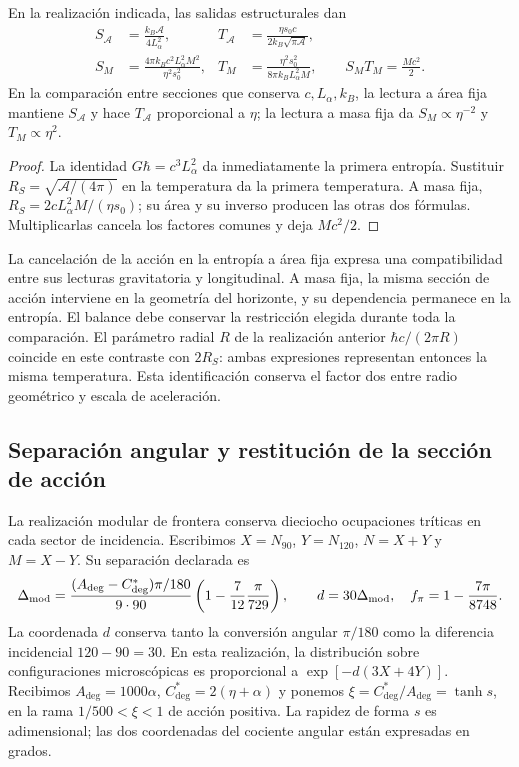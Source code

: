 \begin{proposition}
\label{ins29:vii:area_masa}
En la realización indicada, las salidas estructurales dan
\begin{align*}
 S_{\mathcal A}&=\frac{k_B\mathcal A}{4L_\alpha^2},&
 T_{\mathcal A}&=\frac{\eta s_0c}{2k_B\sqrt{\pi\mathcal A}},\\
 S_M&=\frac{4\pi k_Bc^2L_\alpha^2M^2}{\eta^2s_0^2},&
 T_M&=\frac{\eta^2s_0^2}{8\pi k_BL_\alpha^2M},
 \qquad S_MT_M=\frac{Mc^2}{2}.
\end{align*}
En la comparación entre secciones que conserva \(c,L_\alpha,k_B\),
la lectura a área fija mantiene \(S_{\mathcal A}\) y hace
\(T_{\mathcal A}\) proporcional a \(\eta\); la lectura a masa fija
da \(S_M\propto\eta^{-2}\) y \(T_M\propto\eta^2\).
\end{proposition}
\begin{proof}
La identidad \(G\hbar=c^3L_\alpha^2\) da inmediatamente la primera
entropía. Sustituir \(R_S=\sqrt{\mathcal A/(4\pi)}\) en la temperatura
da la primera temperatura. A masa fija,
\(R_S=2cL_\alpha^2M/(\eta s_0)\); su área y su inverso producen las
otras dos fórmulas. Multiplicarlas cancela los factores comunes y deja
\(Mc^2/2\).
\end{proof}

La cancelación de la acción en la entropía a área fija expresa una
compatibilidad entre sus lecturas gravitatoria y longitudinal. A masa
fija, la misma sección de acción interviene en la geometría del horizonte,
y su dependencia permanece en la entropía. El balance debe conservar la
restricción elegida durante toda la comparación.
El parámetro radial \(R\) de la realización anterior
\(\hbar c/(2\pi R)\) coincide en este contraste con \(2R_S\):
ambas expresiones representan entonces la misma temperatura. Esta
identificación conserva el factor dos entre radio geométrico y escala
de aceleración.

\subsection{Separación angular y restitución de la sección de acción}

La realización modular de frontera conserva dieciocho ocupaciones
tríticas en cada sector de incidencia. Escribimos \(X=N_{90}\),
\(Y=N_{120}\), \(N=X+Y\) y \(M=X-Y\). Su separación declarada es
\[
 \Delta_{\rm mod}=
 \frac{(A_{\deg}-C^*_{\deg})\pi/180}{9\cdot90}
 \left(1-\frac7{12}\frac\pi{729}\right),\qquad
 d=30\Delta_{\rm mod},\quad f_\pi=1-\frac{7\pi}{8748}.
\]
La coordenada \(d\) conserva tanto la conversión angular \(\pi/180\)
como la diferencia incidencial \(120-90=30\).
En esta realización, la distribución sobre configuraciones microscópicas
es proporcional a \(\exp[-d(3X+4Y)]\).
Recibimos \(A_{\deg}=1000\alpha\),
\(C^*_{\deg}=2(\eta+\alpha)\) y ponemos
\(\xi=C^*_{\deg}/A_{\deg}=\tanh s\), en la rama
\(1/500<\xi<1\) de acción positiva. La rapidez de forma \(s\) es
adimensional; las dos coordenadas del cociente angular están expresadas
en grados.


